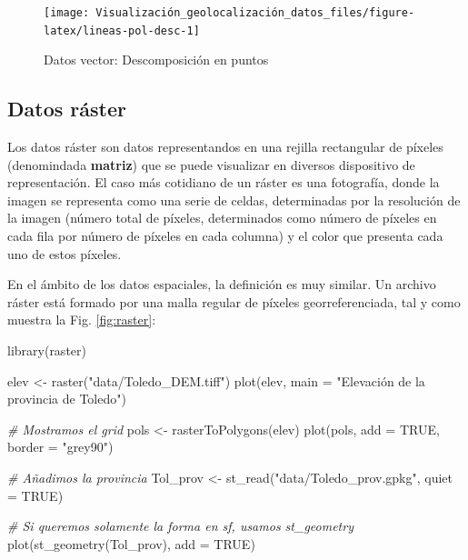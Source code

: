 \documentclass[
]{report}
\newenvironment{Shaded}{\begin{snugshade}}{\end{snugshade}}
\newcommand{\AttributeTok}[1]{\textcolor[rgb]{0.77,0.63,0.00}{#1}}
\newcommand{\CommentTok}[1]{\textcolor[rgb]{0.56,0.35,0.01}{\textit{#1}}}
\newcommand{\ConstantTok}[1]{\textcolor[rgb]{0.00,0.00,0.00}{#1}}
\newcommand{\FunctionTok}[1]{\textcolor[rgb]{0.00,0.00,0.00}{#1}}
\newcommand{\NormalTok}[1]{#1}
\newcommand{\OtherTok}[1]{\textcolor[rgb]{0.56,0.35,0.01}{#1}}
\newcommand{\StringTok}[1]{\textcolor[rgb]{0.31,0.60,0.02}{#1}}
\theoremstyle{definition}
\theoremstyle{definition}
\theoremstyle{definition}
\theoremstyle{definition}
\theoremstyle{remark}
\begin{document}
\begin{figure}

{\centering \texttt{[image: Visualización\_geolocalización\_datos\_files/figure-latex/lineas-pol-desc-1]} 

}

\caption{Datos vector: Descomposición en puntos}\label{fig:lineas-pol-desc}
\end{figure}

\hypertarget{raster}{%
\subsection{Datos ráster}\label{raster}}

Los datos ráster son datos representandos en una rejilla rectangular de píxeles
(denomindada \textbf{matriz}) que se puede visualizar en diversos dispositivo de
representación. El caso más cotidiano de un ráster es una fotografía, donde la
imagen se representa como una serie de celdas, determinadas por la resolución de
la imagen (número total de píxeles, determinados como número de píxeles en cada
fila por número de píxeles en cada columna) y el color que presenta cada uno de
estos píxeles.

En el ámbito de los datos espaciales, la definición es muy similar. Un archivo
ráster está formado por una malla regular de píxeles georreferenciada, tal y
como muestra la Fig. \ref{fig:raster}:

\begin{Shaded}
\begin{Highlighting}[]

\FunctionTok{library}\NormalTok{(raster)}

\NormalTok{elev }\OtherTok{\textless{}{-}} \FunctionTok{raster}\NormalTok{(}\StringTok{"data/Toledo\_DEM.tiff"}\NormalTok{)}
\FunctionTok{plot}\NormalTok{(elev, }\AttributeTok{main =} \StringTok{"Elevación de la provincia de Toledo"}\NormalTok{)}

\CommentTok{\# Mostramos el grid}
\NormalTok{pols }\OtherTok{\textless{}{-}} \FunctionTok{rasterToPolygons}\NormalTok{(elev)}
\FunctionTok{plot}\NormalTok{(pols, }\AttributeTok{add =} \ConstantTok{TRUE}\NormalTok{, }\AttributeTok{border =} \StringTok{"grey90"}\NormalTok{)}

\CommentTok{\# Añadimos la provincia}
\NormalTok{Tol\_prov }\OtherTok{\textless{}{-}} \FunctionTok{st\_read}\NormalTok{(}\StringTok{"data/Toledo\_prov.gpkg"}\NormalTok{, }\AttributeTok{quiet =} \ConstantTok{TRUE}\NormalTok{)}

\CommentTok{\# Si queremos solamente la forma en sf, usamos st\_geometry}
\FunctionTok{plot}\NormalTok{(}\FunctionTok{st\_geometry}\NormalTok{(Tol\_prov), }\AttributeTok{add =} \ConstantTok{TRUE}\NormalTok{)}
\end{Highlighting}
\end{Shaded}
\end{document}
